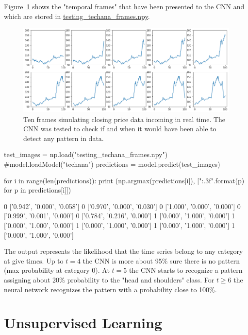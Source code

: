 Figure~\ref{fig:frame_simulation} shows the "temporal frames" that have been presented to the CNN and which are stored in \href{https://drive.google.com/file/d/1924W_OiOYmFQ53sCirG-k3FyekgUl9Wr/view?usp=sharing}{testing\_techana\_frames.npy}.

\begin{figure}
\centering
\includegraphics[width=\textwidth]{figures/tech_ana_frames}
\caption{Ten frames simulating closing price data incoming in real time. The CNN was tested to check if and when it would have been able to detect any pattern in data.}
\label{fig:frame_simulation}
\end{figure}

\begin{ipython}
test_images = np.load("testing_techana_frames.npy")
#model.loadModel("techana")
predictions = model.predict(test_images)

for i in range(len(predictions)):
    print (np.argmax(predictions[i]), ["{:.3f}".format(p) for p in predictions[i]])
\end{ipython}
\begin{ioutput}
0 ['0.942', '0.000', '0.058']
0 ['0.970', '0.000', '0.030']
0 ['1.000', '0.000', '0.000']
0 ['0.999', '0.001', '0.000']
0 ['0.784', '0.216', '0.000']
1 ['0.000', '1.000', '0.000']
1 ['0.000', '1.000', '0.000']
1 ['0.000', '1.000', '0.000']
1 ['0.000', '1.000', '0.000']
1 ['0.000', '1.000', '0.000']
\end{ioutput}
\noindent
The output represents the likelihood that the time series  belong to any category at give times. Up to $t=4$ the CNN is more about 95\% sure there is no pattern (max probability at category 0). 
At $t=5$ the CNN starts to recognize a pattern assigning about 20\% probability to the "head and shoulders" class. For $t\geq 6$ the neural network recognizes the pattern with a probability close to 100\%.

\section{Unsupervised Learning}
    
